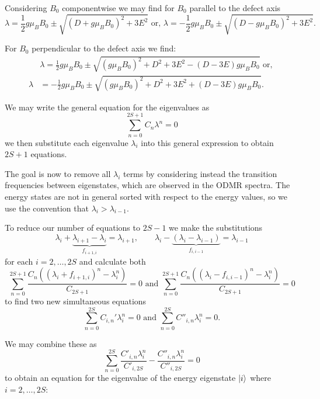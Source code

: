 Considering $B_0$ componentwise we may find \cite{Kirmse1995} for $B_0$ parallel to the defect axis 
\begin{equation}
\lambda = \frac{1}{2}g\mu_B B_0 \pm \sqrt{(D + g\mu_B B_0)^2 + 3E^2} 
   \text{ or, }
   \lambda = -\frac{1}{2} g\mu_B B_0 \pm \sqrt{(D-g\mu_B B_0)^2 + 3E^2}.
\end{equation}

For $B_0$ perpendicular to the defect axis we find:
\begin{equation}
    \begin{align}
        &\lambda = \frac{1}{2}g\mu_B B_0 \pm \sqrt{(g\mu_B B_0)^2 + D^2  + 3E^2 - (D - 3E)g\mu_B B_0}\text{ or, }\\
        \lambda &= -\frac{1}{2}g\mu_B B_0 \pm \sqrt{(g\mu_B B_0)^2 + D^2 + 3E^2 + (D-3E)g\mu_B B_0}.
    \end{align}
\end{equation}

We may write the general equation for the eigenvalues as 
\begin{equation}
    \sum_{n=0}^{2S+1} C_n \lambda^n = 0
    \label{eq:}
\end{equation}
we then substitute each eigenvalue $\lambda_i$ into this general expression to obtain $2S + 1$ equations. 

The goal is now to remove all $\lambda_i$ terms by considering instead the transition frequencies between eigenstates, which are observed in the ODMR spectra. The energy states are not in general sorted with respect to the energy values, so we use the convention that $\lambda_i > \lambda_{i-1}$. 

To reduce our number of equations to $2S-1$ we make the substitutions  
$$\lambda_i + \underbrace{\lambda_{i+1} - \lambda_{i}}_{f_{i+1, i}} = \lambda_{i+1},
\qquad\lambda_i - \underbrace{(\lambda_{i} - \lambda_{i-1})}_{f_{i, i-1}} = \lambda_{i-1}$$
for each $i = 2, \dots, 2S$ and calculate both 
$$\sum_{n=0}^{2S +1} \frac{C_n \left((\lambda_i + f_{i+1, i})^n - \lambda_i^n\right)}{C_{2S+1}} = 0\text{ and } \sum_{n=0}^{2S +1}\frac{C_n \left((\lambda_i - f_{i, i-1})^n - \lambda_i^n\right)}{C_{2S + 1}} = 0$$
to find two new simultaneous equations 
$$\sum_{n=0}^{2S} C_{i,n}' \lambda_i^n = 0 \text{ and } \sum_{n=0}^{2S} C''_{i,n}\lambda_i^n = 0.$$

We may combine these as 
$$\sum_{n=0}^{2S} \frac{C'_{i,n}\lambda_i^n}{C'_{i,2S}}-\frac{C''_{i,n} \lambda_i^n}{C''_{i, 2S}} = 0$$
to obtain an equation for the eigenvalue of the energy eigenstate $\ket{i}$ where $i = 2, \dots, 2S$: 

